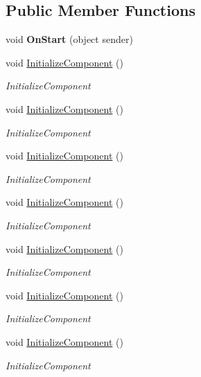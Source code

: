 \subsection*{Public Member Functions}
\begin{DoxyCompactItemize}
\item 
\mbox{\label{class_teacher_handbook_1_1_plugins_1_1_feed_1_1_feed_a70afd18136a6dc16b5edec667a02e6c6}} 
void {\bfseries On\+Start} (object sender)
\item 
void \mbox{\hyperlink{class_teacher_handbook_1_1_plugins_1_1_feed_1_1_feed_af30cfc1a3c7dc2b1874970fbc721113d}{Initialize\+Component}} ()
\begin{DoxyCompactList}\small\item\em Initialize\+Component \end{DoxyCompactList}\item 
void \mbox{\hyperlink{class_teacher_handbook_1_1_plugins_1_1_feed_1_1_feed_af30cfc1a3c7dc2b1874970fbc721113d}{Initialize\+Component}} ()
\begin{DoxyCompactList}\small\item\em Initialize\+Component \end{DoxyCompactList}\item 
void \mbox{\hyperlink{class_teacher_handbook_1_1_plugins_1_1_feed_1_1_feed_af30cfc1a3c7dc2b1874970fbc721113d}{Initialize\+Component}} ()
\begin{DoxyCompactList}\small\item\em Initialize\+Component \end{DoxyCompactList}\item 
void \mbox{\hyperlink{class_teacher_handbook_1_1_plugins_1_1_feed_1_1_feed_af30cfc1a3c7dc2b1874970fbc721113d}{Initialize\+Component}} ()
\begin{DoxyCompactList}\small\item\em Initialize\+Component \end{DoxyCompactList}\item 
void \mbox{\hyperlink{class_teacher_handbook_1_1_plugins_1_1_feed_1_1_feed_af30cfc1a3c7dc2b1874970fbc721113d}{Initialize\+Component}} ()
\begin{DoxyCompactList}\small\item\em Initialize\+Component \end{DoxyCompactList}\item 
void \mbox{\hyperlink{class_teacher_handbook_1_1_plugins_1_1_feed_1_1_feed_af30cfc1a3c7dc2b1874970fbc721113d}{Initialize\+Component}} ()
\begin{DoxyCompactList}\small\item\em Initialize\+Component \end{DoxyCompactList}\item 
void \mbox{\hyperlink{class_teacher_handbook_1_1_plugins_1_1_feed_1_1_feed_af30cfc1a3c7dc2b1874970fbc721113d}{Initialize\+Component}} ()
\begin{DoxyCompactList}\small\item\em Initialize\+Component \end{DoxyCompactList}\end{DoxyCompactItemize}
